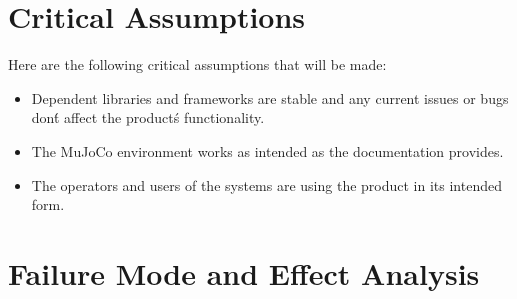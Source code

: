 \documentclass{article}
\begin{document}
\section{Critical Assumptions}


Here are the following critical assumptions that will be made: 

\begin{itemize}
    \item Dependent libraries and frameworks are stable and any current issues or bugs don\'t affect the product\'s functionality.
    \item The MuJoCo environment works as intended as the documentation provides.
    \item The operators and users of the systems are using the product in its intended form.
\end{itemize}

\section{Failure Mode and Effect Analysis}
\end{document}
